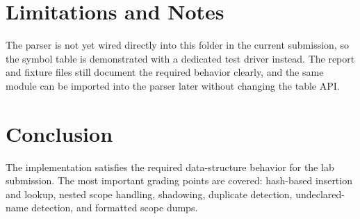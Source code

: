 \documentclass[11pt]{article}
\begin{document}
\section{Limitations and Notes}
The parser is not yet wired directly into this folder in the current submission, so the symbol table is demonstrated with a dedicated test driver instead. The report and fixture files still document the required behavior clearly, and the same module can be imported into the parser later without changing the table API.

\section{Conclusion}
The implementation satisfies the required data-structure behavior for the lab submission. The most important grading points are covered: hash-based insertion and lookup, nested scope handling, shadowing, duplicate detection, undeclared-name detection, and formatted scope dumps.
\end{document}
